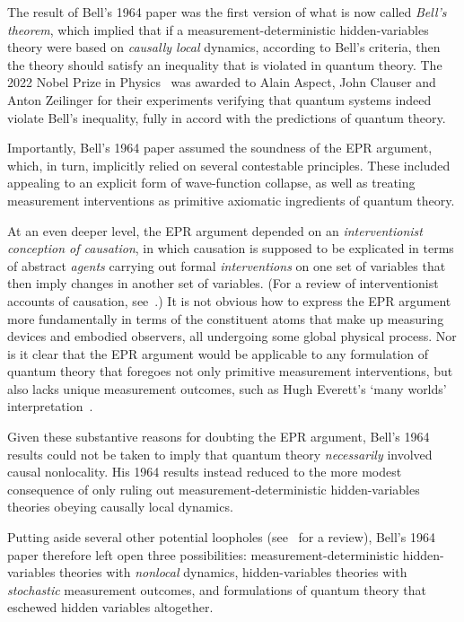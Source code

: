 \documentclass[twoside,twocolumn,english,prl,superscriptaddress,nobibnotes,nofootinbib]{revtex4-2}
\begin{document}
The result of Bell's 1964 paper was the first version of what is now
called \emph{Bell's theorem}, which implied that if a measurement-deterministic
hidden-variables theory were based on \emph{causally local} dynamics,
according to Bell's criteria, then the theory should satisfy an inequality
that is violated in quantum theory. The 2022 Nobel Prize in Physics~\citep{AspectClauserZeilinger:2022tnpip2}
was awarded to Alain Aspect, John Clauser and Anton Zeilinger for
their experiments verifying that quantum systems indeed violate Bell's
inequality, fully in accord with the predictions of quantum theory.

Importantly, Bell's 1964 paper assumed the soundness of the EPR argument,
which, in turn, implicitly relied on several contestable principles.
These included appealing to an explicit form of wave-function collapse,
as well as treating measurement interventions as primitive axiomatic
ingredients of quantum theory.

At an even deeper level, the EPR argument depended on an \emph{interventionist conception of causation},
in which causation is supposed to be explicated in terms of abstract
\emph{agents} carrying out formal \emph{interventions} on one set
of variables that then imply changes in another set of variables.
(For a review of interventionist accounts of causation, see~\citep{Woodward:2023cam}.)
It is not obvious how to express the EPR argument more fundamentally
in terms of the constituent atoms that make up measuring devices and
embodied observers, all undergoing some global physical process. Nor
is it clear that the EPR argument would be applicable to any formulation
of quantum theory that foregoes not only primitive measurement interventions,
but also lacks unique measurement outcomes, such as Hugh Everett's
\textquoteleft many worlds\textquoteright{} interpretation~\citep{Everett:1957rsfqm,Everett:1973tuwf,DeWitt:1970qmr}.

Given these substantive reasons for doubting the EPR argument, Bell's
1964 results could not be taken to imply that quantum theory \emph{necessarily}
involved causal nonlocality. His 1964 results instead reduced to the
more modest consequence of only ruling out measurement-deterministic
hidden-variables theories obeying causally local dynamics.

Putting aside several other potential loopholes (see~\citep{MyrvoldGenoveseShimony:2024bst}
for a review), Bell's 1964 paper therefore left open three possibilities:
measurement-deterministic hidden-variables theories with \emph{nonlocal}
dynamics, hidden-variables theories with \emph{stochastic} measurement
outcomes, and formulations of quantum theory that eschewed hidden
variables altogether.
\end{document}
